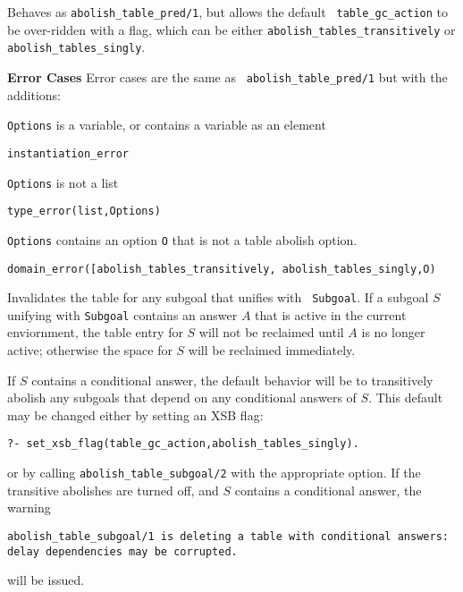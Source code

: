 \begin{description}
\begin{description}
%
Behaves as {\tt abolish\_table\_pred/1}, but allows the default {\tt
  table\_gc\_action} to be over-ridden with a flag, which can be either 
{\tt abolish\_tables\_transitively} or {\tt abolish\_tables\_singly}.

{\bf Error Cases} Error cases are the same as {\tt
  abolish\_table\_pred/1} but with the additions: 
\bi
\item {\tt Options} is a variable, or contains a variable as an element
\bi
\item {\tt instantiation\_error}
\ei
\item {\tt Options} is not a list
\bi
\item {\tt type\_error(list,Options)}
\ei
\item {\tt Options} contains an option {\tt O} that is not a
  table abolish option.
\bi
\item {\tt domain\_error([abolish\_tables\_transitively, abolish\_tables\_singly,O)}
\ei
\ei

%
Invalidates the table for any subgoal that unifies with {\tt
 Subgoal}.  If a subgoal $S$ unifying with {\tt Subgoal} contains
an answer $A$ that is active in the current enviornment, the table
entry for $S$ will not be reclaimed until $A$ is no longer active;
otherwise the space for $S$ will be reclaimed immediately.

If $S$ contains a conditional answer, the default behavior will be to
transitively abolish any subgoals that depend on any conditional
answers of $S$.  This default may be changed either by setting an XSB
flag:
%
\begin{verbatim}
?- set_xsb_flag(table_gc_action,abolish_tables_singly).
\end{verbatim}
% 
or by calling {\tt abolish\_table\_subgoal/2} with the appropriate
option.  If the transitive abolishes are turned off, and $S$ contains
a conditional answer, the warning

{\tt abolish\_table\_subgoal/1 is deleting a table with
  conditional\ answers: \\ delay dependencies may be corrupted.}

will be issued.  


\end{description}
\end{description}
